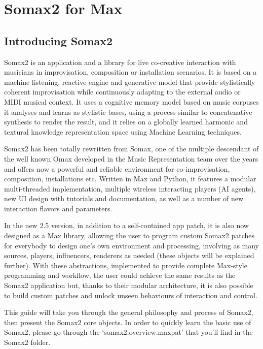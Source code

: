\chapter{Somax2 for Max}\label{sec:introduction}

\section{Introducing Somax2}

Somax2 is an application and a library for live co-creative interaction with musicians in improvisation, composition or installation scenarios. 
It is based on a machine listening, reactive engine and generative model that provide stylistically coherent improvisation while continuously adapting to the external audio or MIDI musical context. 
It uses a cognitive memory model based on music corpuses it analyses and learns as stylistic bases, using a process similar to concatenative synthesis to render the result, and it relies on a globally learned harmonic and textural knowledge representation space using Machine Learning techniques.

Somax2 has been totally rewritten from Somax, one of the multiple descendant of the well known Omax developed in the Music Representation team over the years and offers now a powerful and reliable environment for co-improvisation, composition, installations etc.
Written in Max and Python, it features a modular multi-threaded implementation, multiple wireless interacting players (AI agents), new UI design with tutorials and documentation, as well as a number of new interaction flavors and parameters.

In the new 2.5 version, in addition to a self-contained app patch, it is also now designed as a Max library, allowing the user to program custom Somax2 patches for everybody to design one's own environment and processing, involving as many sources, players, influencers, renderers as needed (these objects will be explained further). With these abstractions, implemented to provide complete Max-style programming and workflow, the user could achieve the same results as the Somax2 application but, thanks to their modular architecture, it is also possible to build custom patches and unlock unseen behaviours of interaction and control.

This guide will take you through the general philosophy and process of Somax2, then present the Somax2 core objects. In order to quickly learn the basic use of Somax2, please go through the `somax2.overview.maxpat' that you'll find in the Somax2 folder.


